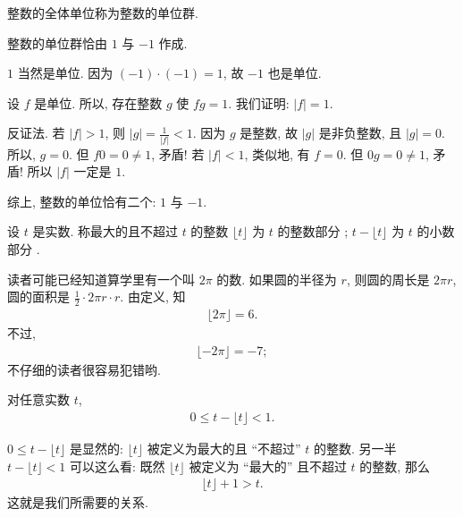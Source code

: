 \begin{definition}
    整数的全体单位称为整数的单位群.
\end{definition}

\begin{proposition}
    整数的单位群恰由 $1$ 与 $-1$ 作成.
\end{proposition}

\begin{pf}
    $1$ 当然是单位. 因为 $(-1) \cdot (-1) = 1$, 故 $-1$ 也是单位.

    设 $f$ 是单位. 所以, 存在整数 $g$ 使 $fg = 1$. 我们证明: $|f| = 1$.

    反证法. 若 $|f| > 1$, 则 $|g| = \frac{1}{|f|} < 1$. 因为 $g$ 是整数, 故 $|g|$ 是非负整数, 且 $|g| = 0$. 所以, $g = 0$. 但 $f0 = 0 \neq 1$, 矛盾! 若 $|f| < 1$, 类似地, 有 $f = 0$. 但 $0g = 0 \neq 1$, 矛盾! 所以 $|f|$ 一定是 $1$.

    综上, 整数的单位恰有二个: $1$ 与 $-1$.
\end{pf}

\begin{definition}
    设 $t$ 是实数. 称最大的且不超过 $t$ 的整数 $\lfloor t \rfloor$ 为 $t$ 的整数部分 ; $t - \lfloor t \rfloor$ 为 $t$ 的小数部分 .
\end{definition}

\begin{example}
    读者可能已经知道算学里有一个叫 $2\pi$ 的数. 如果圆的半径为 $r$, 则圆的周长是 $2\pi r$, 圆的面积是 $\frac12 \cdot 2\pi r \cdot r$. 由定义, 知
    \begin{align*}
        \lfloor 2\pi \rfloor = 6.
    \end{align*}
    不过,
    \begin{align*}
        \lfloor -2\pi \rfloor = -7;
    \end{align*}
    不仔细的读者很容易犯错哟.
\end{example}

\begin{proposition}
    对任意实数 $t$,
    \begin{align*}
        0 \leq t - \lfloor t \rfloor < 1.
    \end{align*}
\end{proposition}

\begin{pf}
    $0 \leq t - \lfloor t \rfloor$ 是显然的: $\lfloor t \rfloor$ 被定义为最大的且 ``不超过'' $t$ 的整数. 另一半 $t - \lfloor t \rfloor < 1$ 可以这么看: 既然 $\lfloor t \rfloor$ 被定义为 ``最大的'' 且不超过 $t$ 的整数, 那么
    \begin{align*}
        \lfloor t \rfloor + 1 > t.
    \end{align*}
    这就是我们所需要的关系.
\end{pf}

